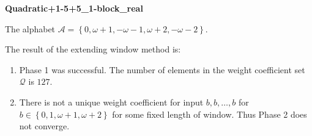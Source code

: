 \begin{exmp}
\textbf{ Quadratic+1-5+5\_1-block\_real }

\label{ex:Quadratic+1-5+51-blockreal}

The alphabet $\mathcal{A} =\left\{0, \omega + 1, -\omega - 1, \omega + 2, -\omega - 2\right\}$.

The result of the extending window method is:
\begin{enumerate}
    \item Phase 1 was successful.
The number of elements in the weight coefficient set $\mathcal{Q}$ is $127$.

    \item There is not a unique weight coefficient for input $b,b,\dots,b$ for $b\in\left\{0, 1, \omega + 1, \omega + 2\right\}$ for some fixed length of window. Thus Phase 2 does not converge.

\end{enumerate}
\end{exmp}
